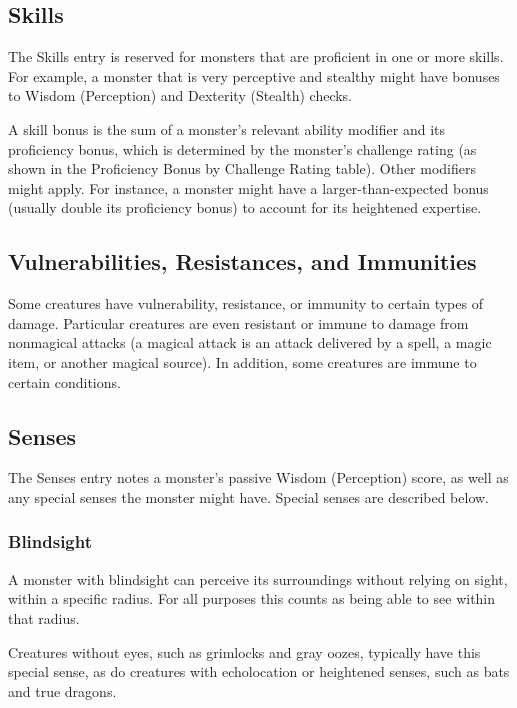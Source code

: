 \subsection{Skills}

The Skills entry is reserved for monsters that are proficient in one or more skills. For example, a monster that is very perceptive and stealthy might have bonuses to Wisdom (Perception) and Dexterity (Stealth) checks.

A skill bonus is the sum of a monster's relevant ability modifier and its proficiency bonus, which is determined by the monster's challenge rating (as shown in the Proficiency Bonus by Challenge Rating table). Other modifiers might apply. For instance, a monster might have a larger-than-expected bonus (usually double its proficiency bonus) to account for its heightened expertise.

\subsection{Vulnerabilities, Resistances, and Immunities}

Some creatures have vulnerability, resistance, or immunity to certain types of damage. Particular creatures are even resistant or immune to damage from nonmagical attacks (a magical attack is an attack delivered by a spell, a magic item, or another magical source). In addition, some creatures are immune to certain conditions.

\subsection{Senses}

The Senses entry notes a monster's passive Wisdom (Perception) score, as well as any special senses the monster might have. Special senses are described below.

\subsubsection{Blindsight}

A monster with blindsight can perceive its surroundings without relying on sight, within a specific radius. For all purposes this counts as being able to see within that radius.

Creatures without eyes, such as grimlocks and gray oozes, typically have this special sense, as do creatures with echolocation or heightened senses, such as bats and true dragons.

